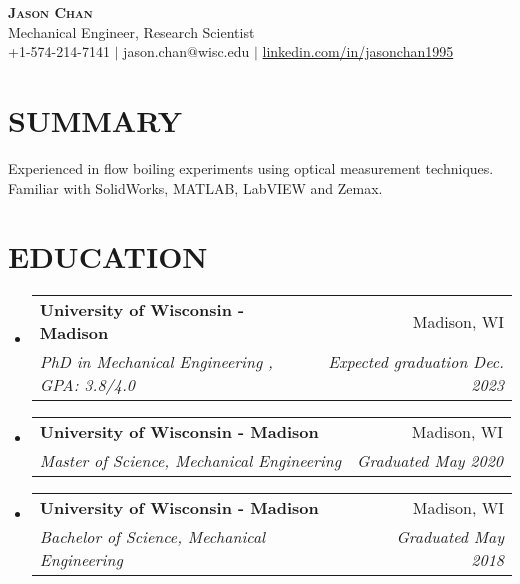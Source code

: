 \documentclass[letterpaper,11pt]{article}
\makeatletter
\newcommand{\GPA}[1]{%
  , GPA: #1/4.0
}
\newcommand{\resumeSubheading}[4]{
  \vspace{-1pt}\item
    \begin{tabular*}{0.97\textwidth}[t]{l@{\extracolsep{\fill}}r}
      \textbf{#1} & #2 \\
      \textit{\small#3} & \textit{\small #4} \\
    \end{tabular*}\vspace{-7pt}
}
\newcommand{\resumeSubHeadingListStart}{\begin{itemize}[leftmargin=0.15in, label={}]}
\newcommand{\resumeSubHeadingListEnd}{\end{itemize}}
\makeatother
\begin{document}


\begin{center}
    \textbf{\LARGE \scshape Jason Chan} \\
    \vspace{1mm}
    Mechanical Engineer, Research Scientist\\ %
    \small +1-574-214-7141  $|$ jason.chan$@$wisc.edu $|$ \href{https://www.linkedin.com/in/jasonchan1995}{linkedin.com/in/jasonchan1995}
\end{center}
\section{SUMMARY}
\begin{comment}
Experienced in design, analysis, and verification of optical and mechanical systems in multiphase fluids research.
\end{comment}
Experienced in flow boiling experiments using optical measurement techniques. Familiar with SolidWorks, MATLAB, LabVIEW and Zemax.
\begin{comment}
Familiar with SolidWorks, MATLAB, and LabVIEW for structural and thermal simulation, experiment and analysis.
\end{comment}

\section{EDUCATION}
    \resumeSubHeadingListStart
      \resumeSubheading
       {University of Wisconsin - Madison}{Madison, WI}
       {PhD in Mechanical Engineering\GPA{3.8}}{Expected graduation Dec. 2023}
    
      \resumeSubheading
        {University of Wisconsin - Madison}{Madison, WI}
        {Master of Science, Mechanical Engineering}{Graduated May 2020}
      
      \resumeSubheading
        {University of Wisconsin - Madison}{Madison, WI}
        {Bachelor of Science, Mechanical Engineering}{Graduated May 2018}
\resumeSubHeadingListEnd
\end{document}
